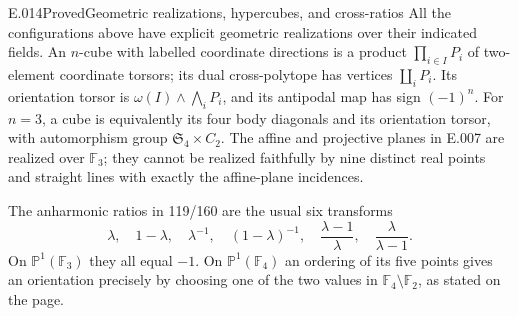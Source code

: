 \begin{saresult}{E.014}{Proved}{Geometric realizations, hypercubes, and cross-ratios}
All the configurations above have explicit geometric realizations over
their indicated fields. An $n$-cube with labelled coordinate directions
is a product $\prod_{i\in I}P_i$ of two-element coordinate torsors; its
dual cross-polytope has vertices $\coprod_iP_i$. Its orientation torsor
is $\omega(I)\wedge\bigwedge_iP_i$, and its antipodal map has sign
$(-1)^n$. For $n=3$, a cube is equivalently its four body diagonals and
its orientation torsor, with automorphism group $\mathfrak S_4\times C_2$.
The affine and projective planes in E.007 are realized over $\mathbb F_3$;
they cannot be realized faithfully by nine distinct real points and
straight lines with exactly the affine-plane incidences.

The anharmonic ratios in 119/160 are the usual six transforms
\[
\lambda,\quad1-\lambda,\quad\lambda^{-1},\quad
(1-\lambda)^{-1},\quad\frac{\lambda-1}{\lambda},\quad
\frac{\lambda}{\lambda-1}.
\]
On $\mathbb P^1(\mathbb F_3)$ they all equal $-1$. On
$\mathbb P^1(\mathbb F_4)$ an ordering of its five points gives an
orientation precisely by choosing one of the two values in
$\mathbb F_4\setminus\mathbb F_2$, as stated on the page.
\end{saresult}

